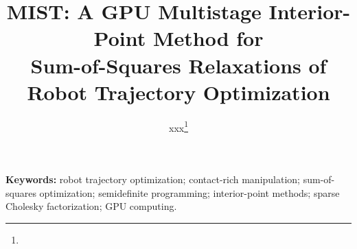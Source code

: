\documentclass[11pt]{article}
\title{MIST: A GPU Multistage Interior-Point Method for\\
Sum-of-Squares Relaxations of Robot Trajectory Optimization}
\author{xxx\thanks{\todo{affiliation, e-mail}} \and \todo{co-authors}}
\date{\todo{date / venue}}
\begin{document}
\maketitle

\begin{abstract}

\end{abstract}

\noindent\textbf{Keywords:} robot trajectory optimization; contact-rich manipulation;
sum-of-squares optimization; semidefinite programming; interior-point methods;
sparse Cholesky factorization; GPU computing.














\appendix



\end{document}
